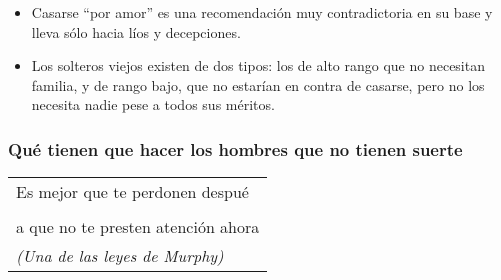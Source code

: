 \begin{itemize}
\tightlist
\item
  Casarse ``por amor'' es una recomendación muy contradictoria en su
  base y lleva sólo hacia líos y decepciones.
\item
  Los solteros viejos existen de dos tipos: los de alto rango que no
  necesitan familia, y de rango bajo, que no estarían en contra de
  casarse, pero no los necesita nadie pese a todos sus méritos.
\end{itemize}

\protect\hypertarget{M17}{}{}

\hypertarget{quuxe9-tienen-que-hacer-los-hombres-que-no-tienen-suerte}{\subsubsection{Qué
tienen que hacer los hombres que no tienen
suerte}\label{quuxe9-tienen-que-hacer-los-hombres-que-no-tienen-suerte}}

\begin{longtable}[]{@{}l@{}}
\toprule
Es mejor que te perdonen despué\tabularnewline
\tabularnewline
a que no te presten atención ahora\tabularnewline
\emph{(Una de las leyes de Murphy)}\tabularnewline
\bottomrule
\end{longtable}

